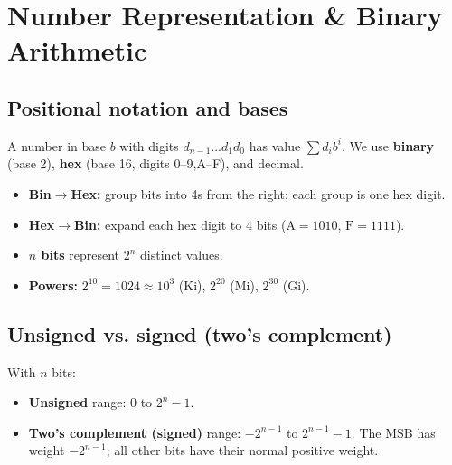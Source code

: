 \documentclass[10pt]{article}
\begin{document}
\section{Number Representation \& Binary Arithmetic}

\subsection{Positional notation and bases}
A number in base $b$ with digits $d_{n-1}\dots d_1 d_0$ has value $\sum d_i b^i$.
We use \textbf{binary} (base 2), \textbf{hex} (base 16, digits 0--9,A--F), and decimal.

\begin{formbox}
\begin{itemize}
\item \textbf{Bin$\to$Hex:} group bits into 4s from the right; each group is one hex digit.
\item \textbf{Hex$\to$Bin:} expand each hex digit to 4 bits ($\text{A}=1010$, $\text{F}=1111$).
\item \textbf{$n$ bits} represent $2^n$ distinct values.
\item \textbf{Powers:} $2^{10}=1024\approx 10^3$ (Ki), $2^{20}$ (Mi), $2^{30}$ (Gi).
\end{itemize}
\end{formbox}

\subsection{Unsigned vs. signed (two's complement)}
With $n$ bits:
\begin{itemize}
\item \textbf{Unsigned} range: $0$ to $2^n-1$.
\item \textbf{Two's complement (signed)} range: $-2^{n-1}$ to $2^{n-1}-1$. The MSB has weight
$-2^{n-1}$; all other bits have their normal positive weight.
\end{itemize}

\begin{center}
\end{center}
\end{document}
